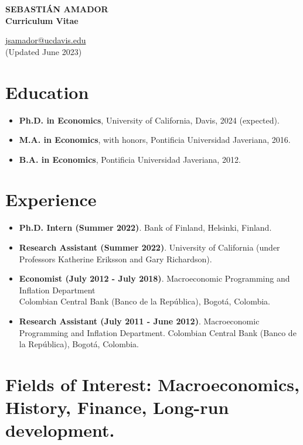 \documentclass{res}
\begin{document}
\begin{center}
\begin{Large}
\textbf{SEBASTI\'{A}N AMADOR\\}
\textbf{Curriculum Vitae}\\
\end{Large}
\begin{small}
\href{mailto:jsamador@ucdavis.edu}{jsamador@ucdavis.edu}\\
(Updated June 2023)
\end{small}
\end{center}
\begin{normalsize}

\section{\textbf{Education}}
\begin{itemize}
\item \textbf{Ph.D. in Economics}, University of California, Davis, 2024 (expected).
\item \textbf{M.A. in Economics}, with honors, Pontificia Universidad Javeriana, 2016.
\item \textbf{B.A. in Economics}, Pontificia Universidad Javeriana, 2012.
\end{itemize}

\section{\textbf{Experience}}
\begin{itemize}
\item  \textbf{Ph.D. Intern (Summer 2022)}.  Bank of Finland, Helsinki, Finland.
\item  \textbf{Research Assistant (Summer 2022)}. University of California (under Professors Katherine Eriksson and Gary Richardson).
\item \textbf{Economist (July 2012 - July 2018)}. Macroeconomic Programming and Inflation Department\\ Colombian Central Bank (Banco de la Rep\'{u}blica), Bogot\'{a}, Colombia.
\item \textbf{Research Assistant (July 2011 - June 2012)}. Macroeconomic Programming and Inflation Department. Colombian Central Bank (Banco de la Rep\'{u}blica), Bogot\'{a}, Colombia.
\end{itemize}

\section{\textbf{Fields of Interest:} Macroeconomics, History, Finance, Long-run development.}


\end{normalsize}
\end{document}
